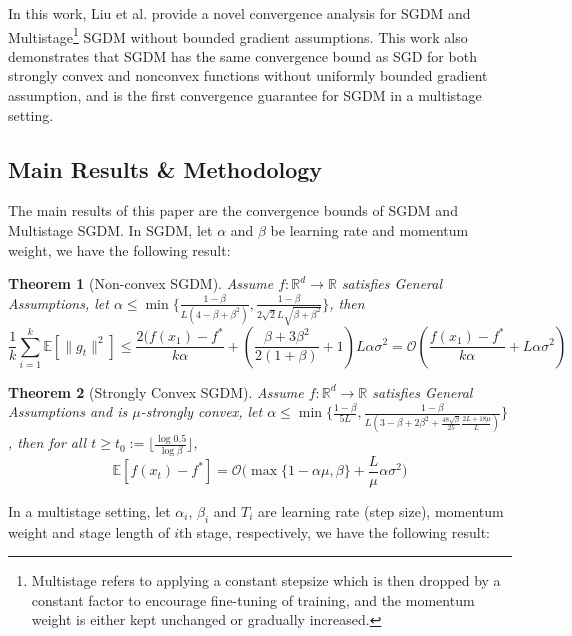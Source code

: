 \documentclass{article}
\newtheorem{theorem}{Theorem}[section]
\begin{document}
In this work, Liu et al. provide a novel convergence analysis for SGDM and
Multistage\footnote{Multistage refers to applying a constant stepsize which is then dropped by a constant factor to encourage fine-tuning of training, and the momentum weight is either kept unchanged or gradually increased.}
SGDM without bounded gradient assumptions. This work also demonstrates that SGDM has the same convergence bound as SGD for both strongly convex and nonconvex functions without uniformly bounded gradient assumption,
and is the first convergence guarantee for SGDM in a multistage setting.

\subsection{Main Results \& Methodology}
The main results of this paper are the convergence bounds of SGDM and Multistage SGDM. In SGDM, let $\alpha$ and $\beta$ be learning rate and momentum weight, we have the following result:
\begin{theorem}[Non-convex SGDM]
	\label{theom41} Assume $f:\mathbb{R}^d \rightarrow \mathbb{R}$ satisfies General Assumptions, let $\alpha \leq \min\{\frac{1 - \beta}{L(4 - \beta + \beta^2)}, \frac{1 - \beta}{2\sqrt{2}L\sqrt{\beta + \beta^2}}\}$, then
	\[\frac{1}{k}\sum_{i = 1}^{k}\mathbb{E}[\|g_t\|^2] \leq \frac{2 (f(x_1) - f^*}{k\alpha} + (\frac{\beta + 3\beta^2}{2 (1 + \beta)} + 1)L\alpha\sigma^2 = \mathcal{O}(\frac{f(x_1) - f^*}{k\alpha} + L\alpha\sigma^2)
	\]
\end{theorem}
\begin{theorem}[Strongly Convex SGDM]
	\label{theom42} Assume $f:\mathbb{R}^d \rightarrow \mathbb{R}$ satisfies General Assumptions and is $\mu$-strongly convex, let $\alpha \leq \min\{\frac{1 - \beta}{5L}, \frac{1 - \beta}{L(3 - \beta + 2\beta^2 + \frac{48\sqrt{\beta}}{25}\frac{2L + 18\mu}{L})}\}$, then for all $t \geq t_0:= \lfloor\frac{\log 0.5}{\log \beta}\rfloor$, 
	\[
		\mathbb{E}[f(x_t) - f^*] = \mathcal{O}\bigl(\max\{1 - \alpha\mu, \beta\} + \frac{L}{\mu}\alpha\sigma^2\bigr)
	\]
\end{theorem}
In a multistage setting, let $\alpha_i$, $\beta_i$ and $T_i$ are learning rate (step size), momentum weight and stage length of $i$th stage, respectively, we have the following result:
\end{document}
